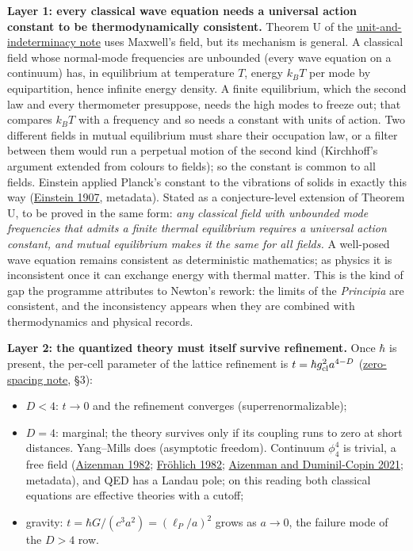 \documentclass[11pt,a4paper]{article}
\newcommand{\tightlist}{\setlength{\itemsep}{0pt}\setlength{\parskip}{0pt}}
\begin{document}
\textbf{Layer 1: every classical wave equation needs a universal action
constant to be thermodynamically consistent.} Theorem U of the
\href{necessity-unit-and-indeterminacy.md}{unit-and-indeterminacy note}
uses Maxwell's field, but its mechanism is general. A classical field
whose normal-mode frequencies are unbounded (every wave equation on a
continuum) has, in equilibrium at temperature \(T\), energy \(k_BT\) per
mode by equipartition, hence infinite energy density. A finite
equilibrium, which the second law and every thermometer presuppose,
needs the high modes to freeze out; that compares \(k_BT\) with a
frequency and so needs a constant with units of action. Two different
fields in mutual equilibrium must share their occupation law, or a
filter between them would run a perpetual motion of the second kind
(Kirchhoff's argument extended from colours to fields); so the constant
is common to all fields. Einstein applied Planck's constant to the
vibrations of solids in exactly this way
(\href{https://doi.org/10.1002/andp.19063270110}{Einstein 1907},
metadata). Stated as a conjecture-level extension of Theorem U, to be
proved in the same form: \emph{any classical field with unbounded mode
frequencies that admits a finite thermal equilibrium requires a
universal action constant, and mutual equilibrium makes it the same for
all fields.} A well-posed wave equation remains consistent as
deterministic mathematics; as physics it is inconsistent once it can
exchange energy with thermal matter. This is the kind of gap the
programme attributes to Newton's rework: the limits of the
\emph{Principia} are consistent, and the inconsistency appears when they
are combined with thermodynamics and physical records.

\textbf{Layer 2: the quantized theory must itself survive refinement.}
Once \(\hbar\) is present, the per-cell parameter of the lattice
refinement is \(t=\hbar g_{\rm cl}^2a^{4-D}\)
(\href{zero-spacing-any-action.md}{zero-spacing note}, §3):

\begin{itemize}
\tightlist
\item
  \(D<4\): \(t\to0\) and the refinement converges (superrenormalizable);
\item
  \(D=4\): marginal; the theory survives only if its coupling runs to
  zero at short distances. Yang--Mills does (asymptotic freedom).
  Continuum \(\phi^4_4\) is trivial, a free field
  (\href{https://doi.org/10.1007/BF01205659}{Aizenman 1982};
  \href{https://doi.org/10.1016/0550-3213(82)90088-8}{Fröhlich 1982};
  \href{https://doi.org/10.4007/annals.2021.194.1.3}{Aizenman and
  Duminil-Copin 2021}; metadata), and QED has a Landau pole; on this
  reading both classical equations are effective theories with a cutoff;
\item
  gravity: \(t=\hbar G/(c^3a^2)=(\ell_P/a)^2\) grows as \(a\to0\), the
  failure mode of the \(D>4\) row.
\end{itemize}
\end{document}
